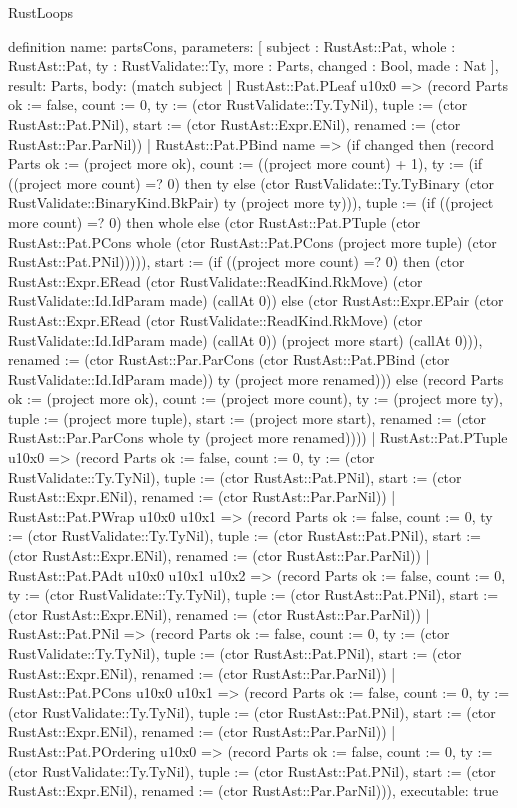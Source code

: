 \begin{lexlean}{RustLoops}
\begin{semanticmodule}
definition{
  name: partsCons,
  parameters: [
    subject : RustAst::Pat,
    whole : RustAst::Pat,
    ty : RustValidate::Ty,
    more : Parts,
    changed : Bool,
    made : Nat
  ],
  result: Parts,
  body: (match subject
    | RustAst::Pat.PLeaf u10x0 => (record Parts {ok := false, count := 0, ty := (ctor RustValidate::Ty.TyNil), tuple := (ctor RustAst::Pat.PNil), start := (ctor RustAst::Expr.ENil), renamed := (ctor RustAst::Par.ParNil)})
    | RustAst::Pat.PBind name => (if changed then (record Parts {ok := (project more ok), count := ((project more count) + 1), ty := (if ((project more count) =? 0) then ty else (ctor RustValidate::Ty.TyBinary (ctor RustValidate::BinaryKind.BkPair) ty (project more ty))), tuple := (if ((project more count) =? 0) then whole else (ctor RustAst::Pat.PTuple (ctor RustAst::Pat.PCons whole (ctor RustAst::Pat.PCons (project more tuple) (ctor RustAst::Pat.PNil))))), start := (if ((project more count) =? 0) then (ctor RustAst::Expr.ERead (ctor RustValidate::ReadKind.RkMove) (ctor RustValidate::Id.IdParam made) (callAt 0)) else (ctor RustAst::Expr.EPair (ctor RustAst::Expr.ERead (ctor RustValidate::ReadKind.RkMove) (ctor RustValidate::Id.IdParam made) (callAt 0)) (project more start) (callAt 0))), renamed := (ctor RustAst::Par.ParCons (ctor RustAst::Pat.PBind (ctor RustValidate::Id.IdParam made)) ty (project more renamed))}) else (record Parts {ok := (project more ok), count := (project more count), ty := (project more ty), tuple := (project more tuple), start := (project more start), renamed := (ctor RustAst::Par.ParCons whole ty (project more renamed))}))
    | RustAst::Pat.PTuple u10x0 => (record Parts {ok := false, count := 0, ty := (ctor RustValidate::Ty.TyNil), tuple := (ctor RustAst::Pat.PNil), start := (ctor RustAst::Expr.ENil), renamed := (ctor RustAst::Par.ParNil)})
    | RustAst::Pat.PWrap u10x0 u10x1 => (record Parts {ok := false, count := 0, ty := (ctor RustValidate::Ty.TyNil), tuple := (ctor RustAst::Pat.PNil), start := (ctor RustAst::Expr.ENil), renamed := (ctor RustAst::Par.ParNil)})
    | RustAst::Pat.PAdt u10x0 u10x1 u10x2 => (record Parts {ok := false, count := 0, ty := (ctor RustValidate::Ty.TyNil), tuple := (ctor RustAst::Pat.PNil), start := (ctor RustAst::Expr.ENil), renamed := (ctor RustAst::Par.ParNil)})
    | RustAst::Pat.PNil => (record Parts {ok := false, count := 0, ty := (ctor RustValidate::Ty.TyNil), tuple := (ctor RustAst::Pat.PNil), start := (ctor RustAst::Expr.ENil), renamed := (ctor RustAst::Par.ParNil)})
    | RustAst::Pat.PCons u10x0 u10x1 => (record Parts {ok := false, count := 0, ty := (ctor RustValidate::Ty.TyNil), tuple := (ctor RustAst::Pat.PNil), start := (ctor RustAst::Expr.ENil), renamed := (ctor RustAst::Par.ParNil)})
    | RustAst::Pat.POrdering u10x0 => (record Parts {ok := false, count := 0, ty := (ctor RustValidate::Ty.TyNil), tuple := (ctor RustAst::Pat.PNil), start := (ctor RustAst::Expr.ENil), renamed := (ctor RustAst::Par.ParNil)})),
  executable: true
}


\end{semanticmodule}
\end{lexlean}
